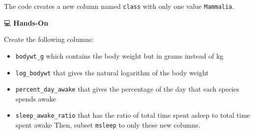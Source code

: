 \documentclass[
  letterpaper,
  DIV=11,
  numbers=noendperiod]{scrreprt}
\begin{document}
\begin{tcolorbox}[enhanced jigsaw, colbacktitle=quarto-callout-tip-color!10!white, opacitybacktitle=0.6, breakable, left=2mm, leftrule=.75mm, toprule=.15mm, toptitle=1mm, bottomtitle=1mm, colframe=quarto-callout-tip-color-frame, opacityback=0, coltitle=black, arc=.35mm, titlerule=0mm, colback=white, bottomrule=.15mm, title=\textcolor{quarto-callout-tip-color}{\faLightbulb}\hspace{0.5em}{Answer}, rightrule=.15mm]

The code creates a new column named \texttt{class} with only one value
\texttt{Mammalia}.

\end{tcolorbox}

💻 \textbf{Hands-On}

Create the following columns:

\begin{itemize}
\item
  \texttt{bodywt\_g} which contains the body weight but in grams instead
  of kg
\item
  \texttt{log\_bodywt} that gives the natural logarithm of the body
  weight
\item
  \texttt{percent\_day\_awake} that gives the percentage of the day that
  each species spends awake
\item
  \texttt{sleep\_awake\_ratio} that has the ratio of total time spent
  asleep to total time spent awake Then, subset \texttt{msleep} to only
  these new columns.
\end{itemize}
\end{document}
